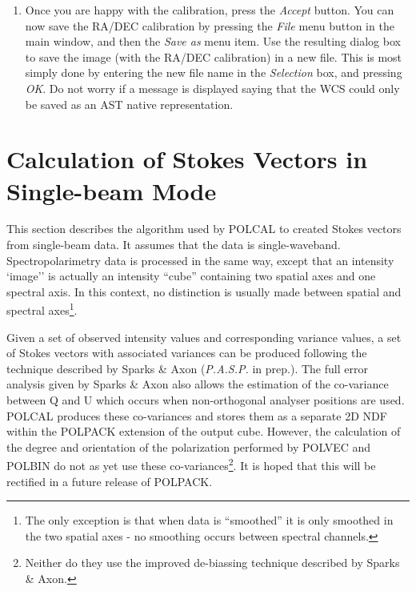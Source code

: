 \documentclass[twoside,11pt]{article}
\newcommand{\htmlref}[2]{#1}
\newcommand{\xlabel}[1]{}
\renewcommand{\_}{\texttt{\symbol{95}}}
\begin{document}
\begin{enumerate}
\item Once you are happy with the calibration, press the \emph{Accept}
button. You can now save the RA/DEC calibration by pressing the \emph{File} 
menu button in the main window, and then the \emph{Save as} menu item. Use the
resulting dialog box to save the image (with the RA/DEC calibration) in a
new file. This is most simply done by entering the new file name in the
\emph{Selection} box, and pressing \emph{OK}. Do not worry if a message is
displayed saying that the WCS could only be saved as an AST native
representation.

\end{enumerate}

\newpage

\section{\label{APP:SNGBM}\xlabel{CalculationofStokesVectorsinSingle-beamMode}
Calculation of Stokes Vectors in Single-beam Mode}

This section describes the algorithm used by \htmlref{POLCAL}{POLCAL} to 
created Stokes vectors from single-beam data. It assumes that the data is
single-waveband. Spectropolarimetry data is processed in the same way,
except that an intensity `image'' is actually an intensity ``cube'' 
containing two spatial axes and one spectral axis. In this context, no
distinction is usually made between spatial and spectral axes\footnote{
The only exception is that when data is ``smoothed'' it is only smoothed
in the two spatial axes - no smoothing occurs between spectral channels.}.

Given a set of observed intensity values and corresponding variance values,
a set of Stokes vectors with associated variances can be produced
following the technique described by Sparks \& Axon (\emph{P.A.S.P.} in
prep.). The full error analysis given by Sparks \& Axon also allows the
estimation of the co-variance between Q and U which occurs when
non-orthogonal analyser positions are used. POLCAL produces these
co-variances and stores them as a separate 2D NDF within the POLPACK
extension of the output cube. However, the calculation of the degree and
orientation of the polarization performed by \htmlref{POLVEC}{POLVEC} and
\htmlref{POLBIN}{POLBIN} do not as yet use these co-variances\footnote{Neither
do they use the improved de-biassing technique described by Sparks \&
Axon.}. It is hoped that this will be rectified in a future release of
POLPACK.
\end{document}
